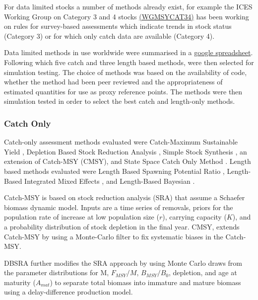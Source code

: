 For data limited stocks a number of methods already exist, for example the ICES Working Group on Category 3 and 4 stocks \href{ 
http://www.ices.dk/sites/pub/Publication Reports/Expert Group Report/acom/2017/WKMSYCAT34/01 WKMSYCAT34 REPORT 2017.pdf}{(WGMSYCAT34)} has been working on rules for survey-based assessments which indicate trends in stock status (Category 3) or for which only catch data are available (Category 4). 

Data limited methods in use worldwide were summarised in a \href{https://docs.google.com/spreadsheets/d/17_qQdzDY41ZrL0yT6QtHpUR4_ydxx_xfCh4GiDqYymU/edit?usp=sharing}{google spreadsheet}. Following which five catch and three length based methods, were then selected for simulation testing. The choice of methods was based on the availability of code, whether the method had been peer reviewed and the appropriateness of estimated quantities for use as proxy reference points. The methods were then simulation tested \citep{pons2019catchlen} in order to select the best catch and length-only methods.


\subsubsection*{Catch Only}

Catch-only assessment methods evaluated were Catch-Maximum Sustainable Yield \citep[Catch-MSY][]{martell2013simple}, Depletion Based  Stock Reduction Analysis \citep[DBSRA][]{dick2011depletion}, Simple Stock Synthesis \citep[SSS][]{cope2013implementing}, an extension of Catch-MSY (CMSY), and State Space Catch Only Method \citep[SSCOM][]{thorson2015catch}. Length based methods evaluated were Length Based Spawning Potential Ratio \citep[LBSPR][]{hordyk2014novel,hordyk2015evaluation}, Length-Based Integrated Mixed Effects \citep[LIME][]{rudd2017accounting}, and Length-Based Bayesian \citep[LBB][]{froese2018new}.

Catch-MSY  is based on stock reduction analysis (SRA) that assume a Schaefer biomass dynamic model. Inputs are a time series of removals, priors for the population rate of increase at low population size ($r$), carrying capacity ($K$), and a probability distribution of stock depletion in the final year. CMSY, extends Catch-MSY by using a Monte-Carlo filter to fix systematic biases in the Catch-MSY. 

DBSRA further modifies the SRA approach by using Monte Carlo draws from the parameter distributions for M, $F_{MSY}/M$, $B_{MSY}/B_0$, depletion, and age at maturity ($A_{mat}$) to separate total biomass into immature and mature biomass using a delay-difference production model. 

